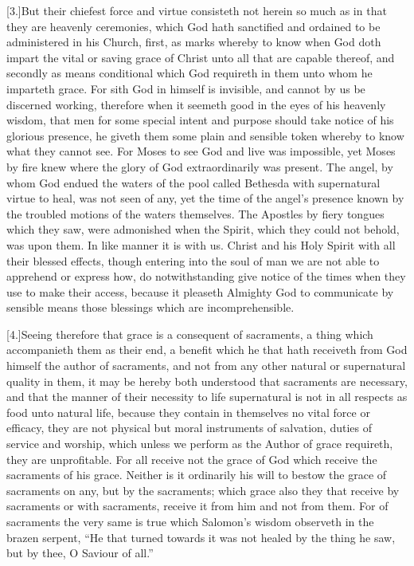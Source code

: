 [3.]But their chiefest force and virtue consisteth not herein so much as in that they are heavenly ceremonies, which God hath sanctified and ordained to be administered in his Church, first, as marks whereby to know when God doth impart the vital or saving grace of Christ unto all that are capable thereof, and secondly as means conditional which  God requireth in them unto whom he imparteth grace.
 For sith God in himself is invisible, and cannot by us be discerned working, therefore when it seemeth good in the eyes of his heavenly wisdom, that men for some special intent and purpose should take notice of his glorious presence, he giveth them some plain and sensible token whereby to know what they cannot see. For Moses to see God and live was impossible, yet Moses by fire knew where the glory of God extraordinarily was present. The angel, by whom God endued the waters of the pool called Bethesda with supernatural virtue to heal, was not seen of any, yet the time of the angel’s presence known by the troubled motions of the waters themselves. The Apostles by fiery tongues which they saw, were admonished when the Spirit, which they could not behold, was upon them. In like manner it is with us. Christ and his Holy Spirit with all their blessed effects, though entering into the soul of man we are not able to apprehend or express how, do notwithstanding give notice of the times when they use to make their access, because it pleaseth Almighty God to communicate by sensible means those blessings which are incomprehensible.

[4.]Seeing therefore that grace is a consequent of sacraments, a thing which accompanieth them as their end, a benefit which he that hath receiveth from God himself the author of sacraments, and not from any other natural or supernatural quality in them, it may be hereby both understood that sacraments are necessary, and that the manner of their necessity to life supernatural is not in all respects as food unto natural life, because they contain in themselves no vital force or efficacy, they are not physical but moral instruments of salvation, duties of service and worship, which unless we perform as the Author of grace requireth, they are unprofitable. For  all receive not the grace of God which receive the sacraments of his grace.
 Neither is it ordinarily his will to bestow the grace of sacraments on any, but by the sacraments; which grace also they that receive by sacraments or with sacraments, receive it from him and not from them. For of sacraments the very same is true which Salomon’s wisdom observeth in the brazen serpent, “He that turned towards it was not healed by the thing he saw, but by thee, O Saviour of all.”

